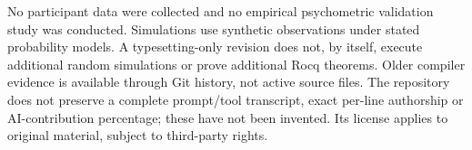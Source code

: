 No participant data were collected and no empirical psychometric validation
study was conducted.
Simulations use synthetic observations under stated probability models. A typesetting-only revision does not, by itself, execute additional random
simulations or prove additional Rocq theorems. Older
compiler evidence is available through Git history, not active source files.
The repository does not preserve a complete prompt/tool transcript, exact per-line authorship
or AI-contribution percentage; these have not been invented. Its license
applies to original material, subject to third-party rights.
